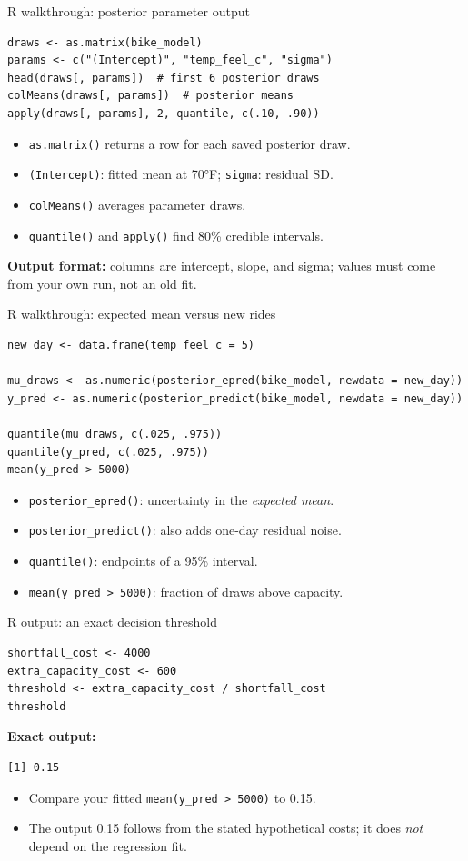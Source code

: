 \documentclass[aspectratio=43,11pt]{beamer}
\begin{document}
\begin{frame}[fragile]{R walkthrough: posterior parameter output}
\footnotesize
\begin{verbatim}
draws <- as.matrix(bike_model)
params <- c("(Intercept)", "temp_feel_c", "sigma")
head(draws[, params])  # first 6 posterior draws
colMeans(draws[, params])  # posterior means
apply(draws[, params], 2, quantile, c(.10, .90))
\end{verbatim}
\small
\begin{itemize}
\item \texttt{as.matrix()} returns a row for each saved posterior draw.
\item \texttt{(Intercept)}: fitted mean at 70°F; \texttt{sigma}: residual SD.
\item \texttt{colMeans()} averages parameter draws.
\item \texttt{quantile()} and \texttt{apply()} find 80\% credible intervals.
\end{itemize}
\textbf{Output format:} columns are intercept, slope, and sigma; values
must come from your own run, not an old fit.
\end{frame}

\begin{frame}[fragile]{R walkthrough: expected mean versus new rides}
\footnotesize
\begin{verbatim}
new_day <- data.frame(temp_feel_c = 5)

mu_draws <- as.numeric(posterior_epred(bike_model, newdata = new_day))
y_pred <- as.numeric(posterior_predict(bike_model, newdata = new_day))

quantile(mu_draws, c(.025, .975))
quantile(y_pred, c(.025, .975))
mean(y_pred > 5000)
\end{verbatim}
\small
\begin{itemize}
\item \texttt{posterior\_epred()}: uncertainty in the \emph{expected mean}.
\item \texttt{posterior\_predict()}: also adds one-day residual noise.
\item \texttt{quantile()}: endpoints of a 95\% interval.
\item \texttt{mean(y\_pred > 5000)}: fraction of draws above capacity.
\end{itemize}
\end{frame}

\begin{frame}[fragile]{R output: an exact decision threshold}
\small
\begin{verbatim}
shortfall_cost <- 4000
extra_capacity_cost <- 600
threshold <- extra_capacity_cost / shortfall_cost
threshold
\end{verbatim}
\textbf{Exact output:}
\begin{verbatim}
[1] 0.15
\end{verbatim}
\begin{itemize}
\item Compare your fitted \texttt{mean(y\_pred > 5000)} to 0.15.
\item The output 0.15 follows from the stated hypothetical costs;
  it does \emph{not} depend on the regression fit.
\end{itemize}
\end{frame}
\end{document}
